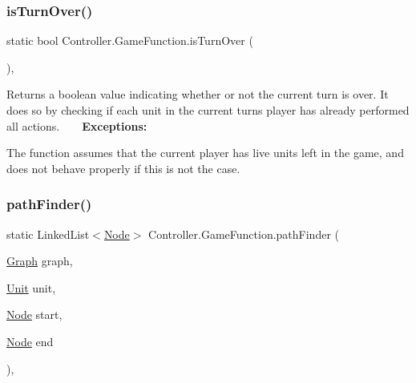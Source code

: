 \subsubsection{\texorpdfstring{is\+Turn\+Over()}{isTurnOver()}}
{\footnotesize\ttfamily static bool Controller.\+Game\+Function.\+is\+Turn\+Over (\begin{DoxyParamCaption}{ }\end{DoxyParamCaption})\hspace{0.3cm}{\ttfamily [inline]}, {\ttfamily [static]}}

Returns a boolean value indicating whether or not the current turn is over. It does so by checking if each unit in the current turn\textquotesingle{}s player has already performed all actions. ~\newline
~\newline
 {\bfseries Exceptions\+:} ~\newline

\begin{DoxyItemize}
\item The function assumes that the current player has live units left in the game, and does not behave properly if this is not the case. 
\end{DoxyItemize}\hypertarget{class_controller_1_1_game_function_a4d9123c98fec7919087096f35838acc8}{}\label{class_controller_1_1_game_function_a4d9123c98fec7919087096f35838acc8} 
\subsubsection{\texorpdfstring{path\+Finder()}{pathFinder()}}
{\footnotesize\ttfamily static Linked\+List$<$\hyperlink{class_model_1_1_map_module_1_1_node}{Node}$>$ Controller.\+Game\+Function.\+path\+Finder (\begin{DoxyParamCaption}\item[{\hyperlink{class_model_1_1_map_module_1_1_graph}{Graph}}]{graph,  }\item[{\hyperlink{interface_model_1_1_unit_module_1_1_unit}{Unit}}]{unit,  }\item[{\hyperlink{class_model_1_1_map_module_1_1_node}{Node}}]{start,  }\item[{\hyperlink{class_model_1_1_map_module_1_1_node}{Node}}]{end }\end{DoxyParamCaption})\hspace{0.3cm}{\ttfamily [inline]}, {\ttfamily [static]}}

